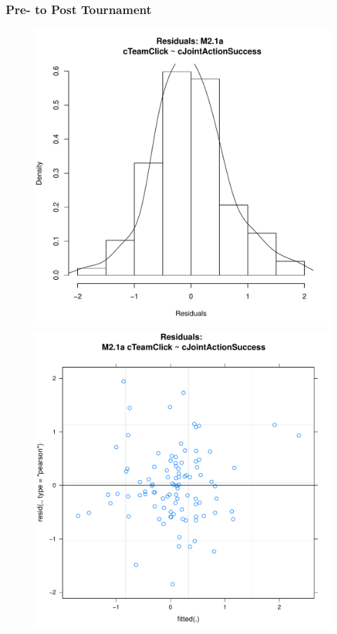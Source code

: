 { \subsubsection{Pre- to Post Tournament}

 


 \begin{figure}[htbp]
   \includegraphics[scale =.4]{images/MLM21aHist.pdf}
   \includegraphics[scale =.4]{images/MLM21aScatter.pdf}

\end{figure}}
